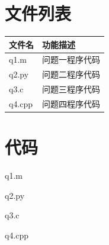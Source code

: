 \documentclass[withoutpreface,bwprint]{cumcmthesis}
\begin{document}
\newpage
\begin{appendices}
\section{文件列表}
\begin{table}[H]
\centering
\begin{tabularx}{\textwidth}{LL}
\toprule
文件名   & 功能描述 \\
\midrule
q1.m & 问题一程序代码 \\
q2.py & 问题二程序代码 \\
q3.c & 问题三程序代码 \\
q4.cpp & 问题四程序代码 \\
\bottomrule
\end{tabularx}
\label{tab:文件列表}
\end{table}

\section{代码}
\noindent q1.m

q2.py

q3.c

q4.cpp

\end{appendices}
\end{document}
